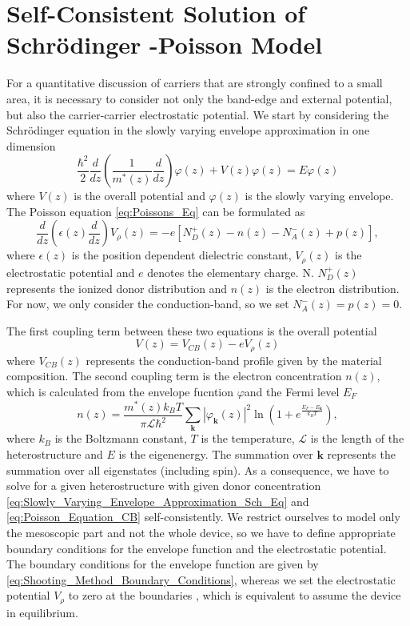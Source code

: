 
\chapter{Self-Consistent Solution of Schr\"{o}dinger -Poisson Model}

\label{cha:Appendix_Schrodinger_Poisson}For a quantitative discussion
of carriers that are strongly confined to a small area, it is necessary
to consider not only the band-edge and external potential, but also
the carrier-carrier electrostatic potential. We start by considering
the Schr\"{o}dinger  equation in the slowly varying envelope approximation
in one dimension\begin{equation}
\frac{\hbar^{2}}{2}\frac{d}{dz}\left(\frac{1}{m^{*}(z)}\frac{d}{dz}\right)\varphi(z)+V(z)\varphi(z)=E\varphi(z)\label{eq:Slowly_Varying_Envelope_Approximation_Sch_Eq}\end{equation}
where $V(z)$ is the overall potential and $\varphi(z)$ is the slowly
varying envelope. The Poisson equation \ref{eq:Poissons_Eq} can be
formulated as\begin{equation}
\frac{d}{dz}\left(\epsilon(z)\frac{d}{dz}\right)V_{\rho}(z)=-e[N_{D}^{+}(z)-n(z)-N_{A}^{-}(z)+p(z)],\label{eq:Poisson_Equation_CB}\end{equation}
where $\epsilon(z)$ is the position dependent dielectric constant,
$V_{\rho}(z)$ is the electrostatic potential and $e$ denotes the
elementary charge. N. $N_{D}^{+}(z)$ represents the ionized donor
distribution and $n(z)$ is the electron distribution. For now, we
only consider the conduction-band, so we set $N_{A}^{-}(z)=p(z)=0$.

The first coupling term between these two equations is the overall
potential\begin{equation}
V(z)=V_{CB}(z)-eV_{\rho}(z)\end{equation}
where $V_{CB}(z)$ represents the conduction-band profile given by
the material composition. The second coupling term is the electron
concentration $n(z)$, which is calculated from the envelope fucntion
$\varphi$and the Fermi level $E_{F}$\begin{equation}
n(z)=\frac{m^{*}(z)k_{B}T}{\pi\mathcal{L}\hbar^{2}}\sum_{\mathbf{k}}\left|\varphi_{\mathbf{k}}(z)\right|^{2}\ln\left(1+e^{\frac{E_{F}-E_{\mathbf{k}}}{k_{B}T}}\right),\label{eq:Fermi_Level_Eq}\end{equation}
where $k_{B}$ is the Boltzmann constant, $T$ is the temperature,
$\mathcal{L}$ is the length of the heterostructure and $E$ is the
eigenenergy. The summation over $\mathbf{k}$ represents the summation
over all eigenstates (including spin). As a consequence, we have to
solve for a given heterostructure with given donor concentration \ref{eq:Slowly_Varying_Envelope_Approximation_Sch_Eq}
and \ref{eq:Poisson_Equation_CB} self-consistently. We restrict ourselves
to model only the mesoscopic part and not the whole device, so we
have to define appropriate boundary conditions for the envelope function
and the electrostatic potential. The boundary conditions for the envelope
function are given by \ref{eq:Shooting_Method_Boundary_Conditions},
whereas we set the electrostatic potential $V_{\rho}$ to zero at
the boundaries \citet{Chuang1995}, which is equivalent to assume
the device in equilibrium.

